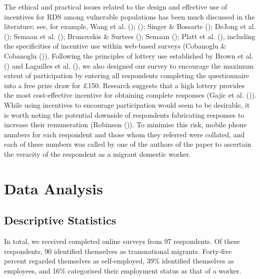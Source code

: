\documentclass[
  12pt,
]{article}
\theoremstyle{plain}
\theoremstyle{definition}
\begin{document}
The ethical and practical issues related to the design and effective use
of incentives for RDS among vulnerable populations has been much
discussed in the literature; see, for example, Wang et al.
();
(); Singer
\& Bossarte (); DeJong et al.
(); Semaan et al.
(); Brunovskis \& Surtees
(); Semaan
(); Platt et al.
(), including the specificities
of incentive use within web-based surveys (Cobanoglu \& Cobanoglu
()). Following the principles
of lottery use established by Brown et al.
() and Laguilles et al.
(), we also designed our survey
to encourage the maximum extent of participation by entering all
respondents completing the questionnaire into a free prize draw for
£150. Research suggests that a high lottery provides the most
cost-effective incentive for obtaining complete responses (Gajic et al.
()). While using
incentives to encourage participation would seem to be desirable, it is
worth noting the potential downside of respondents fabricating responses
to increase their remuneration (Robinson
()). To minimise this risk,
mobile phone numbers for each respondent and those whom they referred
were collated, and each of these numbers was called by one of the
authors of the paper to ascertain the veracity of the respondent as a
migrant domestic worker.

\section{Data Analysis}\label{data-analysis}

\subsection{Descriptive Statistics}\label{descriptive-statistics}

In total, we received completed online surveys from 97 respondents. Of
these respondents, 90 identified themselves as transnational migrants.
Forty-five percent regarded themselves as self-employed, 39\% identified
themselves as employees, and 16\% categorised their employment status as
that of a worker.
\end{document}
